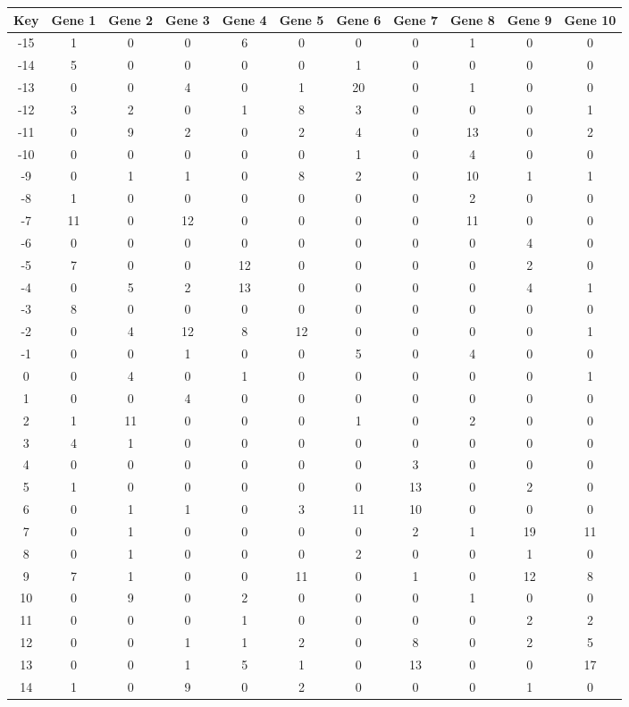 \begin{tabular}{|c|c|c|c|c|c|c|c|c|c|c|}
\hline
Key & Gene 1 & Gene 2 & Gene 3 & Gene 4 & Gene 5 & Gene 6 & Gene 7 & Gene 8 & Gene 9 & Gene 10 \\
\hline
-15 & 1 & 0 & 0 & 6 & 0 & 0 & 0 & 1 & 0 & 0 \\
-14 & 5 & 0 & 0 & 0 & 0 & 1 & 0 & 0 & 0 & 0 \\
-13 & 0 & 0 & 4 & 0 & 1 & 20 & 0 & 1 & 0 & 0 \\
-12 & 3 & 2 & 0 & 1 & 8 & 3 & 0 & 0 & 0 & 1 \\
-11 & 0 & 9 & 2 & 0 & 2 & 4 & 0 & 13 & 0 & 2 \\
-10 & 0 & 0 & 0 & 0 & 0 & 1 & 0 & 4 & 0 & 0 \\
-9 & 0 & 1 & 1 & 0 & 8 & 2 & 0 & 10 & 1 & 1 \\
-8 & 1 & 0 & 0 & 0 & 0 & 0 & 0 & 2 & 0 & 0 \\
-7 & 11 & 0 & 12 & 0 & 0 & 0 & 0 & 11 & 0 & 0 \\
-6 & 0 & 0 & 0 & 0 & 0 & 0 & 0 & 0 & 4 & 0 \\
-5 & 7 & 0 & 0 & 12 & 0 & 0 & 0 & 0 & 2 & 0 \\
-4 & 0 & 5 & 2 & 13 & 0 & 0 & 0 & 0 & 4 & 1 \\
-3 & 8 & 0 & 0 & 0 & 0 & 0 & 0 & 0 & 0 & 0 \\
-2 & 0 & 4 & 12 & 8 & 12 & 0 & 0 & 0 & 0 & 1 \\
-1 & 0 & 0 & 1 & 0 & 0 & 5 & 0 & 4 & 0 & 0 \\
0 & 0 & 4 & 0 & 1 & 0 & 0 & 0 & 0 & 0 & 1 \\
1 & 0 & 0 & 4 & 0 & 0 & 0 & 0 & 0 & 0 & 0 \\
2 & 1 & 11 & 0 & 0 & 0 & 1 & 0 & 2 & 0 & 0 \\
3 & 4 & 1 & 0 & 0 & 0 & 0 & 0 & 0 & 0 & 0 \\
4 & 0 & 0 & 0 & 0 & 0 & 0 & 3 & 0 & 0 & 0 \\
5 & 1 & 0 & 0 & 0 & 0 & 0 & 13 & 0 & 2 & 0 \\
6 & 0 & 1 & 1 & 0 & 3 & 11 & 10 & 0 & 0 & 0 \\
7 & 0 & 1 & 0 & 0 & 0 & 0 & 2 & 1 & 19 & 11 \\
8 & 0 & 1 & 0 & 0 & 0 & 2 & 0 & 0 & 1 & 0 \\
9 & 7 & 1 & 0 & 0 & 11 & 0 & 1 & 0 & 12 & 8 \\
10 & 0 & 9 & 0 & 2 & 0 & 0 & 0 & 1 & 0 & 0 \\
11 & 0 & 0 & 0 & 1 & 0 & 0 & 0 & 0 & 2 & 2 \\
12 & 0 & 0 & 1 & 1 & 2 & 0 & 8 & 0 & 2 & 5 \\
13 & 0 & 0 & 1 & 5 & 1 & 0 & 13 & 0 & 0 & 17 \\
14 & 1 & 0 & 9 & 0 & 2 & 0 & 0 & 0 & 1 & 0 \\
\hline
\end{tabular}